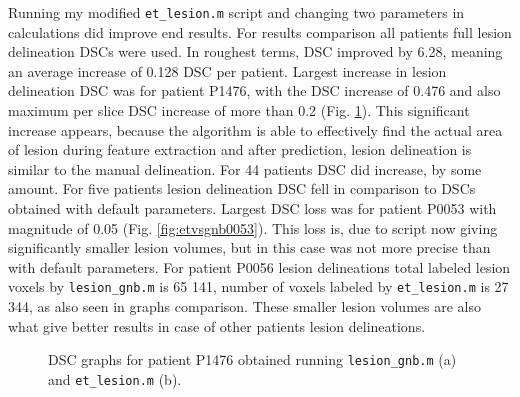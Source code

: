 \documentclass[12pt]{article}
\begin{document}
Running my modified \texttt{et\_lesion.m} script and changing two parameters in calculations did improve end results. For results comparison all patients full lesion delineation DSCs were used. In roughest terms, DSC improved by 6.28, meaning an average increase of 0.128 DSC per patient. Largest increase in lesion delineation DSC was for patient P1476, with the DSC increase of 0.476 and also maximum per slice DSC increase of more than 0.2 (Fig. \ref{fig:etvsgnb1476}). This significant increase appears, because the algorithm is able to effectively find the actual area of lesion during feature extraction and after prediction, lesion delineation is similar to the manual delineation. For 44 patients DSC did increase, by some amount. For five patients lesion delineation DSC fell in comparison to DSCs obtained with default parameters. Largest DSC loss was for patient P0053 with magnitude of 0.05 (Fig. \ref{fig:etvsgnb0053}). This loss is, due to script now giving significantly smaller lesion volumes, but in this case was not more precise than with default parameters. For patient P0056 lesion delineations total labeled lesion voxels by \texttt{lesion\_gnb.m} is 65 141, number of voxels labeled by \texttt{et\_lesion.m} is 27 344, as also seen in graphs comparison. These smaller lesion volumes are also what give better results in case of other patients lesion delineations.

\begin{figure}[!htb]
\centering
{}

\caption{DSC graphs for patient P1476 obtained running \texttt{lesion\_gnb.m} (a) and \texttt{et\_lesion.m} (b).}
\label{fig:etvsgnb1476}
\end{figure}
\end{document}
